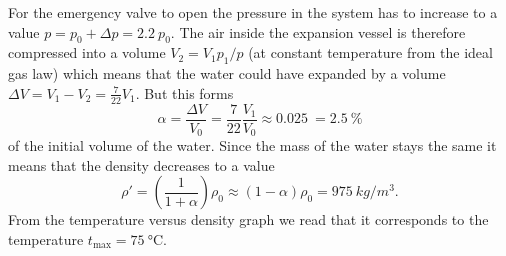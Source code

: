 {\ifEngSolution
For the emergency valve to open the pressure in the system has to increase to a value $p=p_0+\Delta p = \SI{2.2}{}p_0$. The air inside the expansion vessel is therefore compressed into a volume $V_2=V_1 p_1/p$ (at constant temperature from the ideal gas law) which means that the water could have expanded by a volume $\Delta V = V_1-V_2 = \frac{7}{22}V_1$. But this forms
\[\alpha = \frac{\Delta V}{V_0}= \frac{7}{22}\frac{V_1}{V_0}\approx \SI{0.025}{} =  \SI{2.5}{}\%\] 
of the initial volume of the water.  Since the mass of the water stays the same it means that the density decreases to a value
\[\rho'=\left(\frac{1}{1+\alpha}\right)\rho_0\approx(1-\alpha)\rho_0= \SI{975}{kg/m^3}.\] 
From the temperature versus density graph we read that it corresponds to the temperature $t_\text{max}=\SI{75}{\celsius}$.
\fi
}